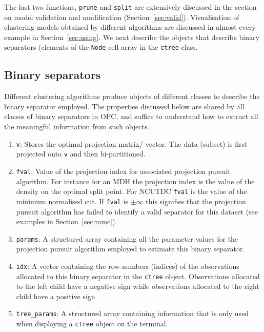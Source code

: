 \documentclass{book}
\begin{document}
\noindent
%
The last two functions, {\tt prune} and {\tt split} are extensively discussed
in the section on model validation and modification (Section~\ref{sec:valid}).
%
Visualisation of clustering models obtained by different algorithms are
discussed in almost every example in Section~\ref{sec:using}.
%
We next describe the objects that describe binary separators (elements
of the {\tt Node} cell array in the {\tt ctree} class.

\subsection*{Binary separators}

Different clustering algorithms produce objects of different classes
to describe the binary separator employed.
%
The properties discussed below are shared by all classes of binary separators
in OPC, and suffice to understand how to extract all the meaningful information
from such objects.

\begin{enumerate}

\item {\tt v}: Stores the optimal projection matrix/ vector. The data (subset)
is first projected onto {\tt v} and then bi-partitioned.

\item {\tt fval}: Value of the projection index for associated projection pursuit
algorithm. For instance for an MDH the projection index is the value of the
density on the optimal split point. For NCUTDC {\tt fval} is the value of the minimum
normalised cut. If {\tt fval} is $\pm \infty$ this signifies that the projection
pursuit algorithm has failed to identify a valid separator for this dataset
(see examples in Section~\ref{sec:mmc}).

\item {\tt params}: A structured array containing all the parameter values for
the projection pursuit algorithm employed to estimate this binary separator.

\item {\tt idx}: A vector containing the row-numbers (indices) of the observations
allocated to this binary separator in the {\tt ctree} object. Observations
allocated to the left child have a negative sign while observations allocated
to the right child have a positive sign.

\item {\tt tree\_params}: A structured array containing information that is
only used when displaying a {\tt ctree} object on the terminal.

\end{enumerate}
\end{document}
